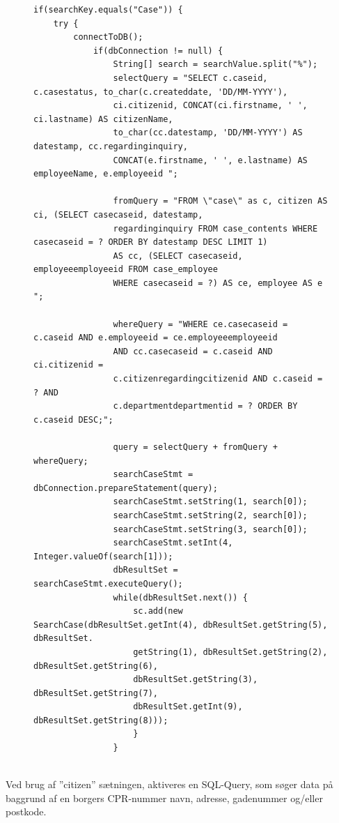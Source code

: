 \begin{figure} [htb!]
\begin{lstlisting}
if(searchKey.equals("Case")) {
	try {
		connectToDB();
			if(dbConnection != null) {
				String[] search = searchValue.split("%");
				selectQuery = "SELECT c.caseid, c.casestatus, to_char(c.createddate, 'DD/MM-YYYY'),
				ci.citizenid, CONCAT(ci.firstname, ' ', ci.lastname) AS citizenName,
				to_char(cc.datestamp, 'DD/MM-YYYY') AS datestamp, cc.regardinginquiry,
				CONCAT(e.firstname, ' ', e.lastname) AS employeeName, e.employeeid ";
				
				fromQuery = "FROM \"case\" as c, citizen AS ci, (SELECT casecaseid, datestamp,
				regardinginquiry FROM case_contents WHERE casecaseid = ? ORDER BY datestamp DESC LIMIT 1)
				AS cc, (SELECT casecaseid, employeeemployeeid FROM case_employee
				WHERE casecaseid = ?) AS ce, employee AS e ";
				
				whereQuery = "WHERE ce.casecaseid = c.caseid AND e.employeeid = ce.employeeemployeeid 
				AND cc.casecaseid = c.caseid AND ci.citizenid = 
				c.citizenregardingcitizenid AND c.caseid = ? AND
				c.departmentdepartmentid = ? ORDER BY c.caseid DESC;";
				
				query = selectQuery + fromQuery + whereQuery;
				searchCaseStmt = dbConnection.prepareStatement(query);
				searchCaseStmt.setString(1, search[0]);
				searchCaseStmt.setString(2, search[0]);
				searchCaseStmt.setString(3, search[0]);
				searchCaseStmt.setInt(4, Integer.valueOf(search[1]));
				dbResultSet = searchCaseStmt.executeQuery();
				while(dbResultSet.next()) {
					sc.add(new SearchCase(dbResultSet.getInt(4), dbResultSet.getString(5), dbResultSet.
					getString(1), dbResultSet.getString(2), dbResultSet.getString(6),
					dbResultSet.getString(3), dbResultSet.getString(7), 
					dbResultSet.getInt(9), dbResultSet.getString(8)));
                    }
                }
\end{lstlisting}
\end{figure}
\\Ved brug af ”citizen” sætningen, aktiveres en SQL-Query, som søger data på baggrund af en borgers CPR-nummer navn, adresse, gadenummer og/eller postkode.\\
